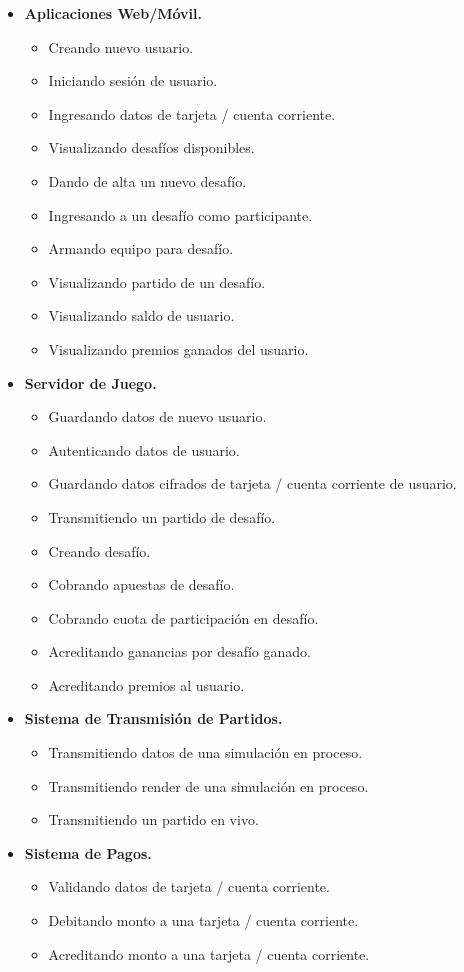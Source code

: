 \documentclass[a4paper, 10pt, twoside]{article}
\begin{document}
\begin{itemize}

  \item \textbf{Aplicaciones Web/Móvil.}
  \begin{itemize}
    \item Creando nuevo usuario.
    \item Iniciando sesión de usuario.
    \item Ingresando datos de tarjeta / cuenta corriente.
    \item Visualizando desafíos disponibles.
    \item Dando de alta un nuevo desafío.
    \item Ingresando a un desafío como participante.
    \item Armando equipo para desafío.
    \item Visualizando partido de un desafío.
    \item Visualizando saldo de usuario.
    \item Visualizando premios ganados del usuario.
  \end{itemize}

  \item \textbf{Servidor de Juego.}
  \begin{itemize}
    \item Guardando datos de nuevo usuario.
    \item Autenticando datos de usuario.
    \item Guardando datos cifrados de tarjeta / cuenta corriente de usuario.
    \item Transmitiendo un partido de desafío.
    \item Creando desafío.
    \item Cobrando apuestas de desafío.
    \item Cobrando cuota de participación en desafío.
    \item Acreditando ganancias por desafío ganado.
    \item Acreditando premios al usuario.
  \end{itemize}

  \item \textbf{Sistema de Transmisión de Partidos.}
  \begin{itemize}
    \item Transmitiendo datos de una simulación en proceso.
    \item Transmitiendo render de una simulación en proceso.
    \item Transmitiendo un partido en vivo.
  \end{itemize}

  \item \textbf{Sistema de Pagos.}
  \begin{itemize}
    \item Validando datos de tarjeta / cuenta corriente.
    \item Debitando monto a una tarjeta / cuenta corriente.
    \item Acreditando monto a una tarjeta / cuenta corriente.
  \end{itemize}

\end{itemize}
\end{document}
